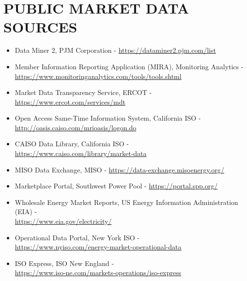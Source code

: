 
\chapter{\uppercase {Public Market Data Sources}}\label{appendix:E}

\begin{itemize}
    \item Data Miner 2, PJM Corporation - \url{https://dataminer2.pjm.com/list}
    \item Member Information Reporting Application (MIRA), Monitoring Analytics - \\ \url{https://www.monitoringanalytics.com/tools/tools.shtml}
    \item Market Data Transparency Service, ERCOT - \\ \url{https://www.ercot.com/services/mdt}
    \item Open Access Same-Time Information System, California ISO - \\ \url{http://oasis.caiso.com/mrioasis/logon.do}
    \item CAISO Data Library, California ISO - \\ \url{https://www.caiso.com/library/market-data}
    \item MISO Data Exchange, MISO - \url{https://data-exchange.misoenergy.org/}
    \item Marketplace Portal, Southwest Power Pool - \url{https://portal.spp.org/}
    \item Wholesale Energy Market Reports, US Energy Information Administration (EIA) - \\ \url{https://www.eia.gov/electricity/}
    \item Operational Data Portal, New York ISO - \\ \url{https://www.nyiso.com/energy-market-operational-data}
    \item ISO Express, ISO New England - \\ \url{https://www.iso-ne.com/markets-operations/iso-express}
\end{itemize}

